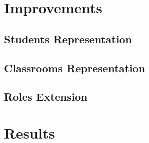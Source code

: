 \documentclass{beamer}
\begin{document}
\section{Improvements}
\subsection{Students Representation}
\subsection{Classrooms Representation}
\subsection{Roles Extension}

\section{Results}
\end{document}
